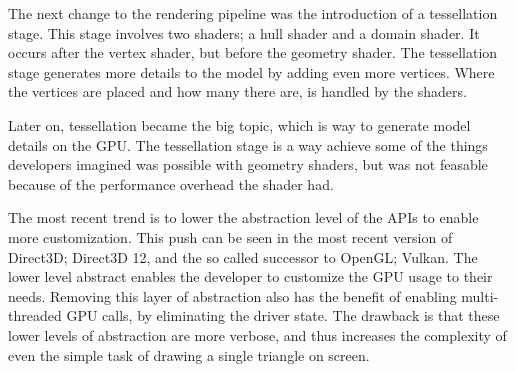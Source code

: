The next change to the rendering pipeline was the introduction of a tessellation stage.
This stage involves two shaders; a hull shader and a domain shader.
It occurs after the vertex shader, but before the geometry shader.
The tessellation stage generates more details to the model by adding even more vertices.
Where the vertices are placed and how many there are, is handled by the shaders.

Later on, tessellation became the big topic, which is way to generate model details on the \gls{GPU}.
The tessellation stage is a way achieve some of the things developers imagined was possible with geometry shaders, but was not feasable because of the performance overhead the shader had.

The most recent trend is to lower the abstraction level of the \glspl{API} to enable more customization.
This push can be seen in the most recent version of Direct3D; Direct3D 12, and the so called successor to OpenGL; Vulkan.
The lower level abstract enables the developer to customize the \gls{GPU} usage to their needs.
Removing this layer of abstraction also has the benefit of enabling multi-threaded \gls{GPU} calls, by eliminating the driver state.
The drawback is that these lower levels of abstraction are more verbose, and thus increases the complexity of even the simple task of drawing a single triangle on screen.
